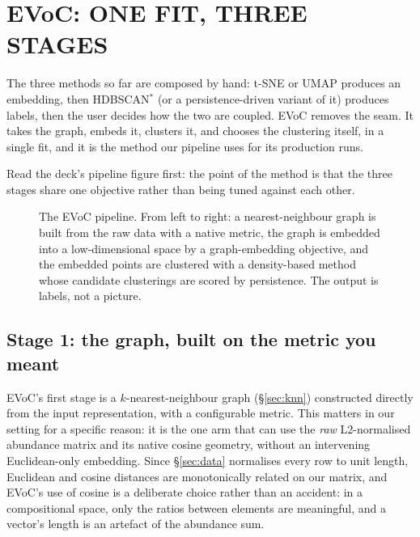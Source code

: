 \section{EVoC: ONE FIT, THREE STAGES}
\label{sec:evoc}


The three methods so far are composed by hand: t-SNE or UMAP produces an
embedding, then HDBSCAN$^*$ (or a persistence-driven variant of it) produces
labels, then the user decides how the two are coupled. EVoC
\citep{EVoC} removes the seam. It takes the graph, embeds it, clusters it, and
chooses the clustering itself, in a single fit, and it is the method our
pipeline uses for its production runs.

Read the deck's pipeline figure first: the point of the method is that the
three stages share one objective rather than being tuned against each other.

\begin{figure}[htbp]\centering
  \caption{The EVoC pipeline. From left to right: a nearest-neighbour graph is
  built from the raw data with a native metric, the graph is embedded into a
  low-dimensional space by a graph-embedding objective, and the embedded points
  are clustered with a density-based method whose candidate clusterings are
  scored by persistence. The output is labels, not a picture.}
  \label{fig:evocpipeline}
\end{figure}

\subsection{Stage 1: the graph, built on the metric you meant}

EVoC's first stage is a $k$-nearest-neighbour graph (\S\ref{sec:knn})
constructed directly from the input representation, with a configurable
metric. This matters in our setting for a specific reason: it is the one arm
that can use the \emph{raw} L2-normalised abundance matrix and its native
cosine geometry, without an intervening Euclidean-only embedding. Since
\S\ref{sec:data} normalises every row to unit length, Euclidean and cosine
distances are monotonically related on our matrix, and EVoC's use of cosine is
a deliberate choice rather than an accident: in a compositional space, only
the ratios between elements are meaningful, and a vector's length is an
artefact of the abundance sum.

